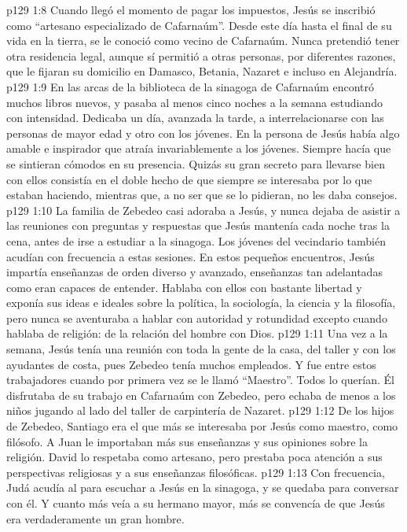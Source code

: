 \vs p129 1:8 Cuando llegó el momento de pagar los impuestos, Jesús se inscribió como “artesano especializado de Cafarnaúm”. Desde este día hasta el final de su vida en la tierra, se le conoció como vecino de Cafarnaúm. Nunca pretendió tener otra residencia legal, aunque sí permitió a otras personas, por diferentes razones, que le fijaran su domicilio en Damasco, Betania, Nazaret e incluso en Alejandría.
\vs p129 1:9 En las arcas de la biblioteca de la sinagoga de Cafarnaúm encontró muchos libros nuevos, y pasaba al menos cinco noches a la semana estudiando con intensidad. Dedicaba un día, avanzada la tarde, a interrelacionarse con las personas de mayor edad y otro con los jóvenes. En la persona de Jesús había algo amable e inspirador que atraía invariablemente a los jóvenes. Siempre hacía que se sintieran cómodos en su presencia. Quizás su gran secreto para llevarse bien con ellos consistía en el doble hecho de que siempre se interesaba por lo que estaban haciendo, mientras que, a no ser que se lo pidieran, no les daba consejos.
\vs p129 1:10 La familia de Zebedeo casi adoraba a Jesús, y nunca dejaba de asistir a las reuniones con preguntas y respuestas que Jesús mantenía cada noche tras la cena, antes de irse a estudiar a la sinagoga. Los jóvenes del vecindario también acudían con frecuencia a estas sesiones. En estos pequeños encuentros, Jesús impartía enseñanzas de orden diverso y avanzado, enseñanzas tan adelantadas como eran capaces de entender. Hablaba con ellos con bastante libertad y exponía sus ideas e ideales sobre la política, la sociología, la ciencia y la filosofía, pero nunca se aventuraba a hablar con autoridad y rotundidad excepto cuando hablaba de religión: de la relación del hombre con Dios.
\vs p129 1:11 Una vez a la semana, Jesús tenía una reunión con toda la gente de la casa, del taller y con los ayudantes de costa, pues Zebedeo tenía muchos empleados. Y fue entre estos trabajadores cuando por primera vez se le llamó “Maestro”. Todos lo querían. Él disfrutaba de su trabajo en Cafarnaúm con Zebedeo, pero echaba de menos a los niños jugando al lado del taller de carpintería de Nazaret.
\vs p129 1:12 De los hijos de Zebedeo, Santiago era el que más se interesaba por Jesús como maestro, como filósofo. A Juan le importaban más sus enseñanzas y sus opiniones sobre la religión. David lo respetaba como artesano, pero prestaba poca atención a sus perspectivas religiosas y a sus enseñanzas filosóficas.
\vs p129 1:13 Con frecuencia, Judá acudía al  para escuchar a Jesús en la sinagoga, y se quedaba para conversar con él. Y cuanto más veía a su hermano mayor, más se convencía de que Jesús era verdaderamente un gran hombre.
